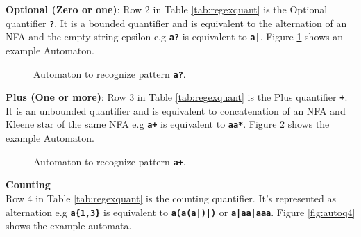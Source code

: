 \noindent
\textbf{Optional (Zero or one)}: Row 2 in Table \ref{tab:regexquant} is the Optional quantifier \texttt{\textbf{?}}. It is a bounded quantifier and is  equivalent to the alternation of an NFA and the empty string epsilon e.g \texttt{\textbf{a?}} is equivalent to \texttt{\textbf{a|\epsilon}}. Figure \ref{fig:autoq3} shows an example Automaton.


\begin{figure}[htpb]
\centering
{}
\caption{Automaton to recognize pattern \texttt{\textbf{a?}}.}
\label{fig:autoq3}
\end{figure}

\noindent
\textbf{Plus (One or more)}: Row 3 in Table \ref{tab:regexquant} is the Plus quantifier \texttt{\textbf{+}}. It is an unbounded quantifier and is equivalent to concatenation of an NFA and Kleene star of the same NFA e.g \texttt{\textbf{a+}} is equivalent to \texttt{\textbf{aa*}}. Figure \ref{fig:autoq2} shows the example Automaton.

\begin{figure}[htpb]
\centering
{}
\caption{Automaton to recognize pattern \texttt{\textbf{a+}}.}
\label{fig:autoq2}
\end{figure}



\noindent
\textbf{Counting}\\
Row 4 in Table \ref{tab:regexquant} is the counting quantifier. It's represented as alternation e.g \texttt{\textbf{a\{1,3\}}} is equivalent to \texttt{\textbf{a(a(a|\epsilon)|\epsilon)}} or \texttt{\textbf{a|aa|aaa}}. Figure \ref{fig:autoq4} shows the example automata.

